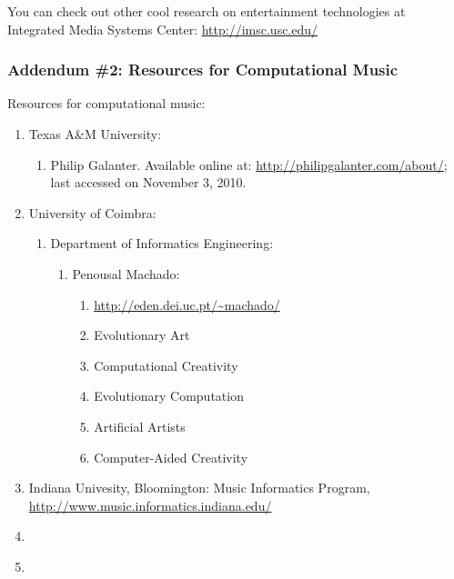  
You can check out other cool research on entertainment technologies at Integrated Media Systems Center: \url{http://imsc.usc.edu/}




\subsubsection{\hspace{0.1in} Addendum \#2: Resources for Computational Music}
\label{compmusicaddendum2}

Resources for computational music: \vspace{-0.3cm}
\begin{enumerate} \itemsep -4pt
\item Texas A\&M University: \vspace{-0.3cm}
	\begin{enumerate} \itemsep -2pt
	\item Philip Galanter. Available online at: \url{http://philipgalanter.com/about/}; last accessed on November 3, 2010.
	\end{enumerate}
\item University of Coimbra: \vspace{-0.3cm}
	\begin{enumerate} \itemsep -2pt
	\item Department of Informatics Engineering: \vspace{-0.2cm}
		\begin{enumerate} \itemsep -2pt
		\item Penousal Machado: \vspace{-0.1cm}
			\begin{enumerate} \itemsep -1pt
			\item \url{http://eden.dei.uc.pt/~machado/}
			\item Evolutionary Art
			\item Computational Creativity
			\item Evolutionary Computation
			\item Artificial Artists
			\item Computer-Aided Creativity
			\end{enumerate}
		\end{enumerate}
	\end{enumerate}
\item Indiana Univesity, Bloomington: Music Informatics Program, \url{http://www.music.informatics.indiana.edu/}
\item \cite{Romero2008}
\item \cite{Miranda2007}
\end{enumerate}



